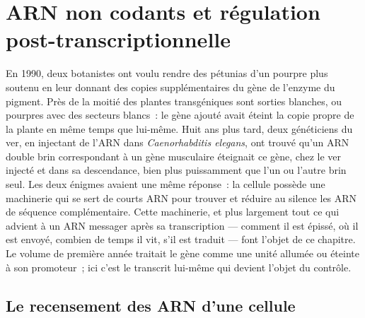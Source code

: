 \chapter{ARN non codants et régulation post-transcriptionnelle}\label{ch:b3:rna-regulation}

En 1990, deux botanistes ont voulu rendre des pétunias d'un pourpre plus
soutenu en leur donnant des copies supplémentaires du gène de l'enzyme
du pigment. Près de la moitié des plantes transgéniques sont sorties
blanches, ou pourpres avec des secteurs blancs~: le gène ajouté avait
éteint la copie propre de la plante en même temps que lui-même. Huit
ans plus tard, deux généticiens du ver, en injectant de l'ARN dans
\emph{Caenorhabditis elegans}, ont trouvé qu'un ARN double brin
correspondant à un gène musculaire éteignait ce gène, chez le ver
injecté et dans sa descendance, bien plus puissamment que l'un ou
l'autre brin seul. Les deux énigmes avaient une même réponse~: la
cellule possède une machinerie qui se sert de courts ARN pour trouver
et réduire au silence les ARN de séquence complémentaire. Cette
machinerie, et plus largement tout ce qui advient à un ARN messager
après sa transcription --- comment il est épissé, où il est envoyé,
combien de temps il vit, s'il est traduit --- font l'objet de ce
chapitre. Le volume de première année traitait le gène comme une unité
allumée ou éteinte à son promoteur~; ici c'est le transcrit lui-même
qui devient l'objet du contrôle.

\section{Le recensement des ARN d'une cellule}

